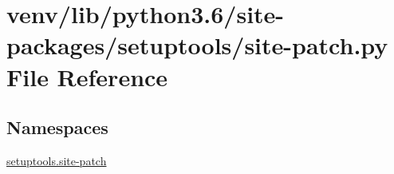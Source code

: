 \hypertarget{site-patch_8py}{}\section{venv/lib/python3.6/site-\/packages/setuptools/site-\/patch.py File Reference}
\label{site-patch_8py}
\subsection*{Namespaces}
\begin{DoxyCompactItemize}
\item 
 \hyperlink{namespacesetuptools_1_1site-patch}{setuptools.\+site-\/patch}
\end{DoxyCompactItemize}

